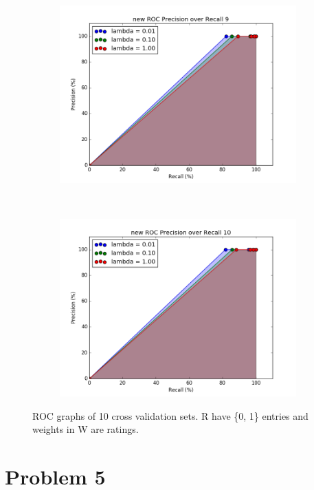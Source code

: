 \documentclass[12pt]{article}
\begin{document}
\begin{figure}[h!]
\ContinuedFloat     
    \begin{subfigure}[t]{0.5\textwidth}
        \centering
        \includegraphics[width=1.\textwidth]{graphs/problem4_ROC9}
        \caption{}
    \end{subfigure}%
    ~ 
    \begin{subfigure}[t]{0.5\textwidth}
        \centering
        \includegraphics[width=1.\textwidth]{graphs/problem4_ROC10}
        \caption{}
    \end{subfigure}%
  
    \caption{ROC graphs of 10 cross validation sets. R have \{0, 1\} entries and weights in W are ratings.}
\end{figure}

\section*{Problem 5}
\end{document}

